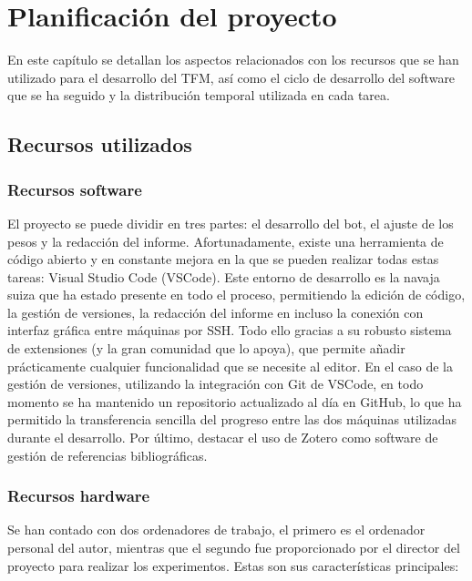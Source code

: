 \chapter{Planificación del proyecto} \label{chap:planificacion}

En este capítulo se detallan los aspectos relacionados con los recursos que se han utilizado para el desarrollo del TFM, así como el ciclo de desarrollo del software que se ha seguido y la distribución temporal utilizada en cada tarea.

\section{Recursos utilizados} \label{sec:recursos_utilizados}

\subsection{Recursos software} \label{sec:recursos_software}

El proyecto se puede dividir en tres partes: el desarrollo del bot, el ajuste de los pesos y la redacción del informe. Afortunadamente, existe una herramienta de código abierto y en constante mejora en la que se pueden realizar todas estas tareas: Visual Studio Code (VSCode). Este entorno de desarrollo es la navaja suiza que ha estado presente en todo el proceso, permitiendo la edición de código, la gestión de versiones, la redacción del informe en incluso la conexión con interfaz gráfica entre máquinas por SSH. Todo ello gracias a su robusto sistema de extensiones (y la gran comunidad que lo apoya), que permite añadir prácticamente cualquier funcionalidad que se necesite al editor. En el caso de la gestión de versiones, utilizando la integración con Git de VSCode, en todo momento se ha mantenido un repositorio actualizado al día en GitHub, lo que ha permitido la transferencia sencilla del progreso entre las dos máquinas utilizadas durante el desarrollo. Por último, destacar el uso de Zotero como software de gestión de referencias bibliográficas.

\subsection{Recursos hardware} \label{sec:recursos_hardware}

Se han contado con dos ordenadores de trabajo, el primero es el ordenador personal del autor, mientras que el segundo fue proporcionado por el director del proyecto para realizar los experimentos. Estas son sus características principales:

